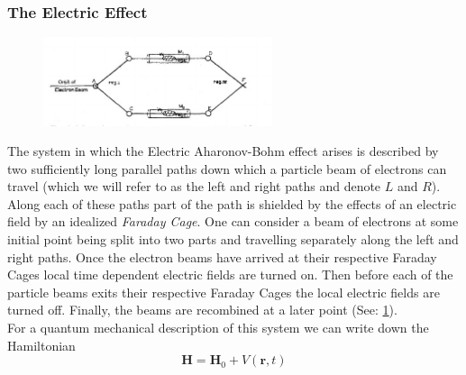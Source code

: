 \documentclass{article}
\begin{document}
\subsubsection{The Electric Effect}\label{sssec:electric_effect}

 \begin{figure}[h]
   \centering
   \includegraphics[width=0.6\textwidth]{electric_effect}
   \label{fig:ABE}
 \end{figure}
 
The system in which the Electric Aharonov-Bohm effect arises is described by two sufficiently long parallel paths down which a particle beam of electrons can travel (which we will refer to as the left and right paths and denote $L$ and $R$). Along each of these paths part of the path is shielded by the effects of an electric field by an idealized \textit{Faraday Cage}. One can consider a beam of electrons at some initial point being split into two parts and travelling separately along the left and right paths. Once the electron beams have arrived at their respective Faraday Cages local time dependent electric fields are turned on. Then before each of the particle beams exits their respective Faraday Cages the local electric fields are turned off. Finally, the beams are recombined at a later point (See: \ref{fig:ABE}).\\

For a quantum mechanical description of this system we can write down the Hamiltonian
\begin{equation*}
  \bm{H} = \bm{H}_{0} + V(\bm{r},t)
\end{equation*}
\end{document}
